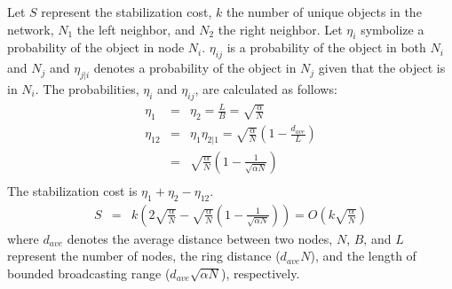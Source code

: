 \documentclass[conference]{IEEEtran}
\begin{document}
Let $S$ represent the stabilization cost, $k$ the number of unique objects in the network, 
$N_1$ the left neighbor, 
and $N_2$ the right neighbor. Let $\eta_i$ symbolize a probability of the object in node $N_i$. 
$\eta_{ij}$ is a probability of the object in both $N_i$ and $N_j$ and  
$\eta_{j|i}$ denotes a probability of the object in $N_j$ given that the object is in 
$N_i$. 
The probabilities, $\eta_i$ and $\eta_{ij}$, are calculated as follows:
\begin{eqnarray*}
\eta_1 &=& \eta_2 = \frac{L}{B} = \sqrt{\frac{\alpha}{N}} \\
\eta_{12} &=& \eta_1 \eta_{2|1} = \sqrt{\frac{\alpha}{N}}\left( 1-\frac{d_{ave}}{L} \right) \\
          &=& \sqrt{\frac{\alpha}{N}}\left(1-\frac{1}{\sqrt{\alpha N}}\right) \\
\end{eqnarray*}
The stabilization cost is $\eta_1+\eta_2-\eta_{12}$.
\begin{eqnarray*}
S &=& k\left(2\sqrt{\frac{\alpha}{N}}-\sqrt{\frac{\alpha}{N}}\left(1-\frac{1}{\sqrt{\alpha N}}\right) \right) 
    = O\left(k\sqrt{\frac{\alpha}{N}}\right)
\end{eqnarray*}
where $d_{ave}$ denotes the average distance between two nodes, 
$N$, $B$, and $L$ represent the number 
of nodes, the ring distance ($d_{ave}N$), 
and the length of bounded broadcasting range ($d_{ave}\sqrt{\alpha N}$), respectively.
\end{document}
